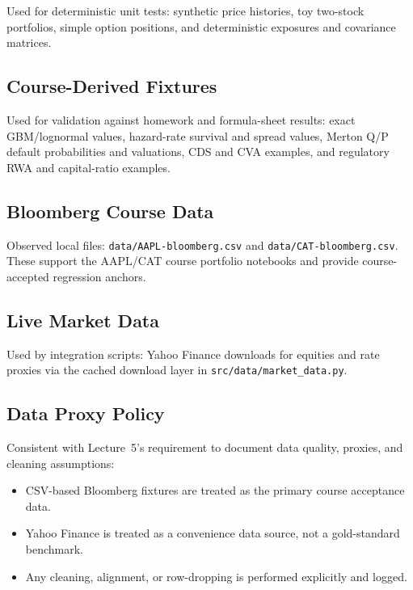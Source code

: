 \documentclass[11pt]{article}
\newcommand{\code}[1]{\texttt{#1}}
\begin{document}
Used for deterministic unit tests: synthetic price histories, toy
two-stock portfolios, simple option positions, and deterministic
exposures and covariance matrices.

\subsection{Course-Derived Fixtures}

Used for validation against homework and formula-sheet results:
exact GBM/lognormal values, hazard-rate survival and spread values,
Merton Q/P default probabilities and valuations, CDS and CVA examples,
and regulatory RWA and capital-ratio examples.

\subsection{Bloomberg Course Data}

Observed local files: \code{data/AAPL-bloomberg.csv} and
\code{data/CAT-bloomberg.csv}.  These support the AAPL/CAT course
portfolio notebooks and provide course-accepted regression anchors.

\subsection{Live Market Data}

Used by integration scripts: Yahoo Finance downloads for equities and
rate proxies via the cached download layer in \code{src/data/market\_data.py}.

\subsection{Data Proxy Policy}

Consistent with Lecture~5's requirement to document data quality, proxies,
and cleaning assumptions:

\begin{itemize}
  \item CSV-based Bloomberg fixtures are treated as the primary course
    acceptance data.
  \item Yahoo Finance is treated as a convenience data source, not a
    gold-standard benchmark.
  \item Any cleaning, alignment, or row-dropping is performed explicitly
    and logged.
\end{itemize}

\end{document}
